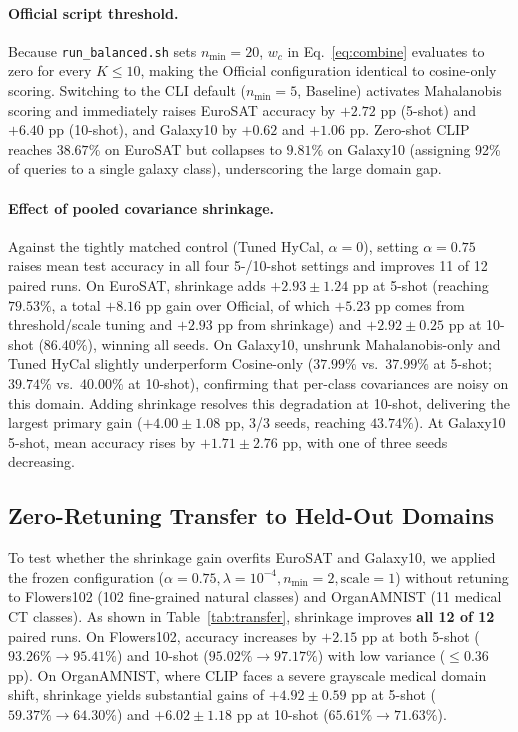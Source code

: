 \documentclass[letterpaper]{article} %
\newcommand{\nmin}{n_{\min}}
\begin{document}
\paragraph{Official script threshold.}
Because \texttt{run\_balanced.sh} sets $\nmin = 20$, $w_c$ in Eq.~\eqref{eq:combine} evaluates to zero for every $K \le 10$, making the Official configuration identical to cosine-only scoring. Switching to the CLI default ($\nmin = 5$, Baseline) activates Mahalanobis scoring and immediately raises EuroSAT accuracy by $+2.72$ pp (5-shot) and $+6.40$ pp (10-shot), and Galaxy10 by $+0.62$ and $+1.06$ pp. Zero-shot CLIP reaches $38.67\%$ on EuroSAT but collapses to $9.81\%$ on Galaxy10 (assigning 92\% of queries to a single galaxy class), underscoring the large domain gap.

\paragraph{Effect of pooled covariance shrinkage.}
Against the tightly matched control (Tuned HyCal, $\alpha = 0$), setting $\alpha = 0.75$ raises mean test accuracy in all four 5-/10-shot settings and improves 11 of 12 paired runs. On EuroSAT, shrinkage adds $+2.93 \pm 1.24$ pp at 5-shot (reaching $79.53\%$, a total $+8.16$ pp gain over Official, of which $+5.23$ pp comes from threshold/scale tuning and $+2.93$ pp from shrinkage) and $+2.92 \pm 0.25$ pp at 10-shot ($86.40\%$), winning all seeds. On Galaxy10, unshrunk Mahalanobis-only and Tuned HyCal slightly underperform Cosine-only ($37.99\%$ vs.\ $37.99\%$ at 5-shot; $39.74\%$ vs.\ $40.00\%$ at 10-shot), confirming that per-class covariances are noisy on this domain. Adding shrinkage resolves this degradation at 10-shot, delivering the largest primary gain ($+4.00 \pm 1.08$ pp, 3/3 seeds, reaching $43.74\%$). At Galaxy10 5-shot, mean accuracy rises by $+1.71 \pm 2.76$ pp, with one of three seeds decreasing.

\subsection{Zero-Retuning Transfer to Held-Out Domains}

To test whether the shrinkage gain overfits EuroSAT and Galaxy10, we applied the frozen configuration ($\alpha = 0.75, \lambda = 10^{-4}, \nmin = 2, \mathrm{scale} = 1$) without retuning to Flowers102 (102 fine-grained natural classes) and OrganAMNIST (11 medical CT classes). As shown in Table~\ref{tab:transfer}, shrinkage improves \textbf{all 12 of 12} paired runs. On Flowers102, accuracy increases by $+2.15$ pp at both 5-shot ($93.26\% \to 95.41\%$) and 10-shot ($95.02\% \to 97.17\%$) with low variance ($\le 0.36$ pp). On OrganAMNIST, where CLIP faces a severe grayscale medical domain shift, shrinkage yields substantial gains of $+4.92 \pm 0.59$ pp at 5-shot ($59.37\% \to 64.30\%$) and $+6.02 \pm 1.18$ pp at 10-shot ($65.61\% \to 71.63\%$).
\end{document}

